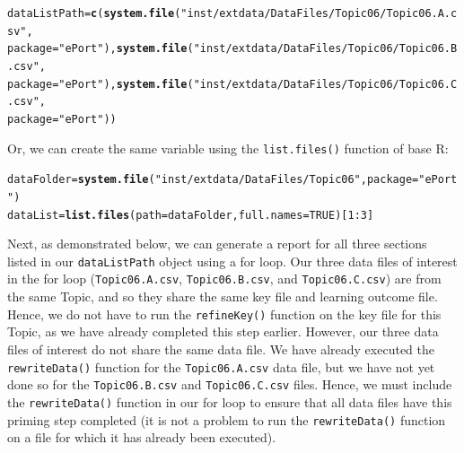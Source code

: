 \documentclass{article}\usepackage[]{graphicx}\usepackage[]{color}
\makeatletter
\newcommand{\hlnum}[1]{\textcolor[rgb]{0.686,0.059,0.569}{#1}}%
\newcommand{\hlstr}[1]{\textcolor[rgb]{0.192,0.494,0.8}{#1}}%
\newcommand{\hlopt}[1]{\textcolor[rgb]{0,0,0}{#1}}%
\newcommand{\hlstd}[1]{\textcolor[rgb]{0.345,0.345,0.345}{#1}}%
\newcommand{\hlkwb}[1]{\textcolor[rgb]{0.69,0.353,0.396}{#1}}%
\newcommand{\hlkwc}[1]{\textcolor[rgb]{0.333,0.667,0.333}{#1}}%
\newcommand{\hlkwd}[1]{\textcolor[rgb]{0.737,0.353,0.396}{\textbf{#1}}}%
\newenvironment{kframe}{%
 \def\at@end@of@kframe{}%
 \ifinner\ifhmode%
  \def\at@end@of@kframe{\end{minipage}}%
  \begin{minipage}{\columnwidth}%
 \fi\fi%
 \def\FrameCommand##1{\hskip\@totalleftmargin \hskip-\fboxsep
 \colorbox{shadecolor}{##1}\hskip-\fboxsep
     \hskip-\linewidth \hskip-\@totalleftmargin \hskip\columnwidth}%
 \MakeFramed {\advance\hsize-\width
   \@totalleftmargin\z@ \linewidth\hsize
   \@setminipage}}%
 {\par\unskip\endMakeFramed%
 \at@end@of@kframe}
\newenvironment{knitrout}{}{} %
\numberwithin{equation}{section} %
\makeatother
\begin{document}
\begin{knitrout}
\color{fgcolor}\begin{kframe}
\begin{alltt}
\hlstd{dataListPath} \hlkwb{=} \hlkwd{c}\hlstd{(}\hlkwd{system.file}\hlstd{(}\hlstr{"inst/extdata/DataFiles/Topic06/Topic06.A.csv"}\hlstd{,}
  \hlkwc{package} \hlstd{=} \hlstr{"ePort"}\hlstd{),} \hlkwd{system.file}\hlstd{(}\hlstr{"inst/extdata/DataFiles/Topic06/Topic06.B.csv"}\hlstd{,}
  \hlkwc{package} \hlstd{=} \hlstr{"ePort"}\hlstd{),} \hlkwd{system.file}\hlstd{(}\hlstr{"inst/extdata/DataFiles/Topic06/Topic06.C.csv"}\hlstd{,}
  \hlkwc{package} \hlstd{=} \hlstr{"ePort"}\hlstd{))}
\end{alltt}
\end{kframe}
\end{knitrout}

Or, we can create the same variable using the \texttt{list.files()} function of base R:

\begin{knitrout}
\color{fgcolor}\begin{kframe}
\begin{alltt}
\hlstd{dataFolder} \hlkwb{=} \hlkwd{system.file}\hlstd{(}\hlstr{"inst/extdata/DataFiles/Topic06"}\hlstd{,} \hlkwc{package}\hlstd{=}\hlstr{"ePort"}\hlstd{)}
\hlstd{dataList} \hlkwb{=} \hlkwd{list.files}\hlstd{(}\hlkwc{path} \hlstd{= dataFolder,} \hlkwc{full.names}\hlstd{=}\hlnum{TRUE}\hlstd{)[}\hlnum{1}\hlopt{:}\hlnum{3}\hlstd{]}
\end{alltt}
\end{kframe}
\end{knitrout}

Next, as demonstrated below, we can generate a report for all three sections listed in our \texttt{dataListPath} object using a for loop. Our three data files of interest in the for loop (\texttt{Topic06.A.csv}, \texttt{Topic06.B.csv}, and \texttt{Topic06.C.csv}) are from the same Topic, and so they share the same key file and learning outcome file. Hence, we do not have to run the \texttt{refineKey()} function on the key file for this Topic, as we have already completed this step earlier. However, our three data files of interest do not share the same data file. We have already executed the \texttt{rewriteData()} function for the \texttt{Topic06.A.csv} data file, but we have not yet done so for the \texttt{Topic06.B.csv} and \texttt{Topic06.C.csv} files. Hence, we must include the \texttt{rewriteData()} function in our for loop to ensure that all data files have this priming step completed (it is not a problem to run the \texttt{rewriteData()} function on a file for which it has already been executed). 
\end{document}
